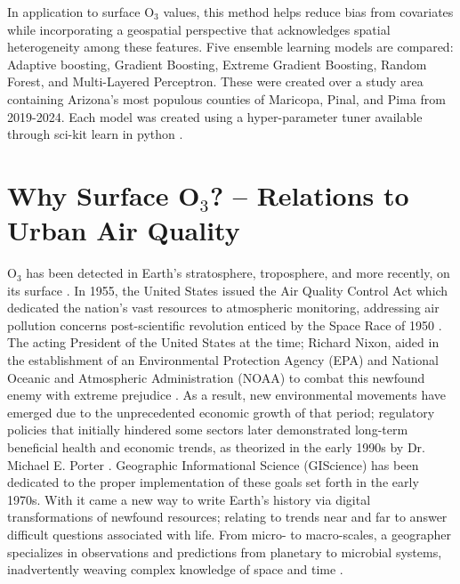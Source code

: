 In application to surface O$_3$ values, this method helps reduce bias from covariates while incorporating a geospatial perspective that acknowledges spatial heterogeneity among these features. Five ensemble learning models are compared: Adaptive boosting, Gradient Boosting, Extreme Gradient Boosting, Random Forest, and Multi-Layered Perceptron. These were created over a study area containing Arizona’s most populous counties of Maricopa, Pinal, and Pima from 2019-2024. Each model was created using a hyper-parameter tuner available through sci-kit learn in python \cite{buitinck_api_2013}. 
\section{Why Surface O$_3$? – Relations to Urban Air Quality} \label{introchap:whyO$_3$} O$_3$ has been detected in Earth’s stratosphere, troposphere, and more recently, on its surface \cite{claeyman_thermal_2011,davies_episodes_1994,he_sensitivity_1999,lin_springtime_2012,gao_case_2016}. In 1955, the United States issued the Air Quality Control Act which dedicated the nation’s vast resources to atmospheric monitoring, addressing air pollution concerns post-scientific revolution enticed by the Space Race of 1950 \cite{epa_benefits_2015}. The acting President of the United States at the time; Richard Nixon, aided in the establishment of an Environmental Protection Agency (EPA) and National Oceanic and Atmospheric Administration (NOAA) to combat this newfound enemy with extreme prejudice \cite{nixon_reorganization_1970}. As a result, new environmental movements have emerged due to the unprecedented economic growth of that period; regulatory policies that initially hindered some sectors later demonstrated long-term beneficial health and economic trends, as theorized in the early 1990s by Dr. Michael E. Porter \parencite{ambec_theoretical_2002}. Geographic Informational Science (GIScience) has been dedicated to the proper implementation of these goals set forth in the early 1970s. With it came a new way to write Earth’s history via digital transformations of newfound resources; relating to trends near and far to answer difficult questions associated with life. From micro- to macro-scales, a geographer specializes in observations and predictions from planetary to microbial systems, inadvertently weaving complex knowledge of space and time \cite{goodchild_geographical_1992}. 

